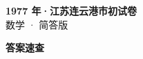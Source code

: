 \documentclass[zihao=-4, a4paper]{ctexart}
\begin{document}
\begin{center}
  {\Large\bfseries 1977 年·江苏连云港市初试卷}\\[4pt]
  {\large 数学 · 简答版}
\end{center}
\medskip
{}

\clearpage
{}
\begin{center}{\Large\bfseries 答案速查}\end{center}
\medskip

\end{document}
